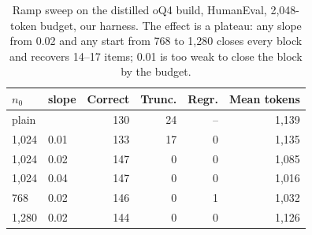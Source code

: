 \begin{table}[t]
\centering
\caption{Ramp sweep on the distilled oQ4 build, HumanEval, 2{,}048-token budget, our harness. The effect is a plateau: any slope from 0.02 and any start from 768 to 1{,}280 closes every block and recovers 14--17 items; 0.01 is too weak to close the block by the budget.}
\label{tab:sweep}
\begin{tabular}{llrrrr}
\toprule
$n_0$ & slope & Correct & Trunc. & Regr. & Mean tokens \\
\midrule
\multicolumn{2}{l}{plain} & 130 & 24 & -- & 1,139 \\
\midrule
1{,}024 & 0.01 & 133 & 17 & 0 & 1,135 \\
1{,}024 & 0.02 & 147 & 0 & 0 & 1,085 \\
1{,}024 & 0.04 & 147 & 0 & 0 & 1,016 \\
768 & 0.02 & 146 & 0 & 1 & 1,032 \\
1{,}280 & 0.02 & 144 & 0 & 0 & 1,126 \\
\bottomrule
\end{tabular}
\end{table}
